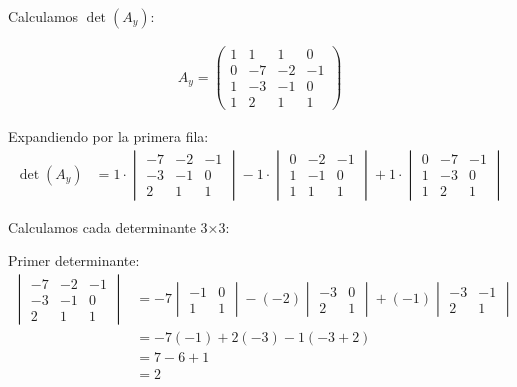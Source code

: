 \documentclass{article}
\begin{document}
Calculamos $\det(A_y)$:

\begin{align}
    A_y = \begin{pmatrix}
    1 & 1 & 1 & 0 \\
    0 & -7 & -2 & -1 \\
    1 & -3 & -1 & 0 \\
    1 & 2 & 1 & 1
    \end{pmatrix}
\end{align}

Expandiendo por la primera fila:
\begin{align}
    \det(A_y) &= 1 \cdot \begin{vmatrix} -7 & -2 & -1 \\ -3 & -1 & 0 \\ 2 & 1 & 1 \end{vmatrix} - 1 \cdot \begin{vmatrix} 0 & -2 & -1 \\ 1 & -1 & 0 \\ 1 & 1 & 1 \end{vmatrix} + 1 \cdot \begin{vmatrix} 0 & -7 & -1 \\ 1 & -3 & 0 \\ 1 & 2 & 1 \end{vmatrix}
\end{align}

Calculamos cada determinante 3×3:

Primer determinante:
\begin{align}
    \begin{vmatrix} -7 & -2 & -1 \\ -3 & -1 & 0 \\ 2 & 1 & 1 \end{vmatrix} &= -7 \begin{vmatrix} -1 & 0 \\ 1 & 1 \end{vmatrix} - (-2) \begin{vmatrix} -3 & 0 \\ 2 & 1 \end{vmatrix} + (-1) \begin{vmatrix} -3 & -1 \\ 2 & 1 \end{vmatrix} \\
    &= -7(-1) + 2(-3) - 1(-3 + 2) \\
    &= 7 - 6 + 1 \\
    &= 2
\end{align}
\end{document}
